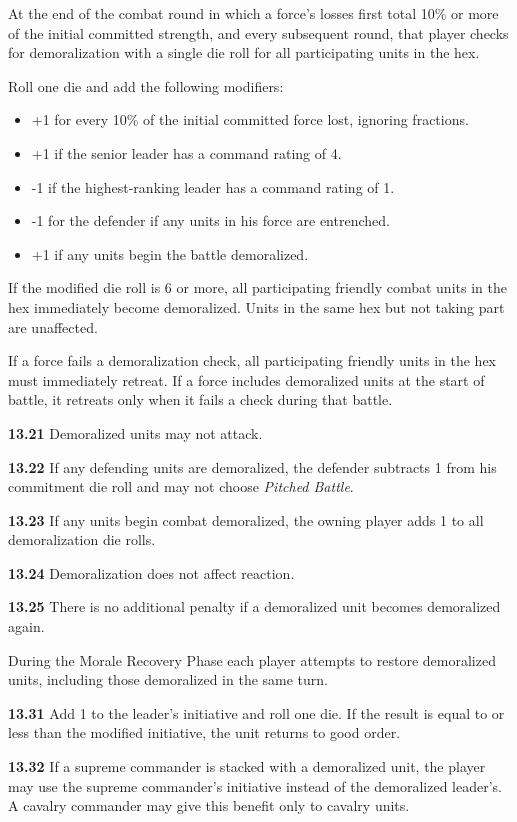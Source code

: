 
At the end of the combat round in which a force's losses first total 10\% or more of the initial committed strength, and every subsequent round, that player checks for demoralization with a single die roll for all participating units in the hex.


Roll one die and add the following modifiers:
\begin{itemize}
\item +1 for every 10\% of the initial committed force lost, ignoring fractions.
\item +1 if the senior leader has a command rating of 4.
\item -1 if the highest-ranking leader has a command rating of 1.
\item -1 for the defender if any units in his force are entrenched.
\item +1 if any units begin the battle demoralized.
\end{itemize}

If the modified die roll is 6 or more, all participating friendly combat units in the hex immediately become demoralized. Units in the same hex but not taking part are unaffected.


If a force fails a demoralization check, all participating friendly units in the hex must immediately retreat. If a force includes demoralized units at the start of battle, it retreats only when it fails a check during that battle.

\textbf{13.21} Demoralized units may not attack.

\textbf{13.22} If any defending units are demoralized, the defender subtracts 1 from his commitment die roll and may not choose \textit{Pitched Battle}.

\textbf{13.23} If any units begin combat demoralized, the owning player adds 1 to all demoralization die rolls.

\textbf{13.24} Demoralization does not affect reaction.

\textbf{13.25} There is no additional penalty if a demoralized unit becomes demoralized again.


During the Morale Recovery Phase each player attempts to restore demoralized units, including those demoralized in the same turn.

\textbf{13.31} Add 1 to the leader's initiative and roll one die. If the result is equal to or less than the modified initiative, the unit returns to good order.

\textbf{13.32} If a supreme commander is stacked with a demoralized unit, the player may use the supreme commander's initiative instead of the demoralized leader's. A cavalry commander may give this benefit only to cavalry units.

